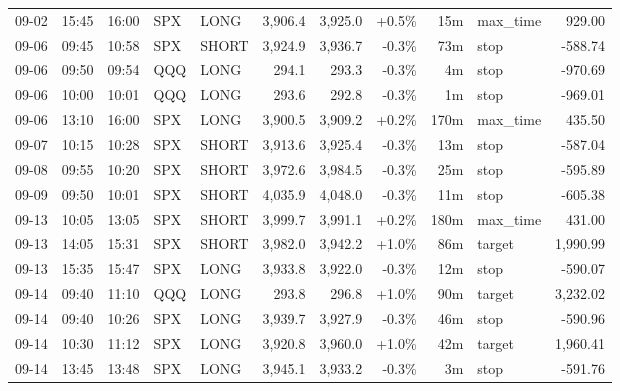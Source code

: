 \documentclass[11pt,a4paper,twoside]{article}
\begin{document}
\begin{center}
\begin{longtable}{>{\color{txtmain}}l l l l l r r r r >{\color{txtmain}}l r}
09-02 & 15:45 & 16:00 & SPX & LONG & 3,906.4 & 3,925.0 & \textcolor{wingreen}{+0.5\%} & 15m & max\_time & \textcolor{wingreen}{929.00} \\
09-06 & 09:45 & 10:58 & SPX & SHORT & 3,924.9 & 3,936.7 & \textcolor{lossred}{-0.3\%} & 73m & stop & \textcolor{lossred}{-588.74} \\
09-06 & 09:50 & 09:54 & QQQ & LONG & 294.1 & 293.3 & \textcolor{lossred}{-0.3\%} & 4m & stop & \textcolor{lossred}{-970.69} \\
09-06 & 10:00 & 10:01 & QQQ & LONG & 293.6 & 292.8 & \textcolor{lossred}{-0.3\%} & 1m & stop & \textcolor{lossred}{-969.01} \\
09-06 & 13:10 & 16:00 & SPX & LONG & 3,900.5 & 3,909.2 & \textcolor{wingreen}{+0.2\%} & 170m & max\_time & \textcolor{wingreen}{435.50} \\
09-07 & 10:15 & 10:28 & SPX & SHORT & 3,913.6 & 3,925.4 & \textcolor{lossred}{-0.3\%} & 13m & stop & \textcolor{lossred}{-587.04} \\
09-08 & 09:55 & 10:20 & SPX & SHORT & 3,972.6 & 3,984.5 & \textcolor{lossred}{-0.3\%} & 25m & stop & \textcolor{lossred}{-595.89} \\
09-09 & 09:50 & 10:01 & SPX & SHORT & 4,035.9 & 4,048.0 & \textcolor{lossred}{-0.3\%} & 11m & stop & \textcolor{lossred}{-605.38} \\
09-13 & 10:05 & 13:05 & SPX & SHORT & 3,999.7 & 3,991.1 & \textcolor{wingreen}{+0.2\%} & 180m & max\_time & \textcolor{wingreen}{431.00} \\
09-13 & 14:05 & 15:31 & SPX & SHORT & 3,982.0 & 3,942.2 & \textcolor{wingreen}{+1.0\%} & 86m & target & \textcolor{wingreen}{1,990.99} \\
09-13 & 15:35 & 15:47 & SPX & LONG & 3,933.8 & 3,922.0 & \textcolor{lossred}{-0.3\%} & 12m & stop & \textcolor{lossred}{-590.07} \\
09-14 & 09:40 & 11:10 & QQQ & LONG & 293.8 & 296.8 & \textcolor{wingreen}{+1.0\%} & 90m & target & \textcolor{wingreen}{3,232.02} \\
09-14 & 09:40 & 10:26 & SPX & LONG & 3,939.7 & 3,927.9 & \textcolor{lossred}{-0.3\%} & 46m & stop & \textcolor{lossred}{-590.96} \\
09-14 & 10:30 & 11:12 & SPX & LONG & 3,920.8 & 3,960.0 & \textcolor{wingreen}{+1.0\%} & 42m & target & \textcolor{wingreen}{1,960.41} \\
09-14 & 13:45 & 13:48 & SPX & LONG & 3,945.1 & 3,933.2 & \textcolor{lossred}{-0.3\%} & 3m & stop & \textcolor{lossred}{-591.76} \\

\end{longtable}
\end{center}
\end{document}
